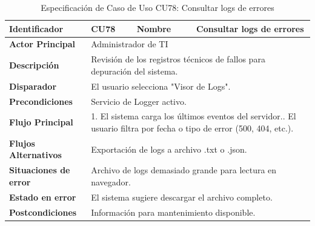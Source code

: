 \begingroup
\setlength{\parskip}{0pt}
\begin{longtable}{|p{3.5cm}|p{2cm}|p{2.5cm}|p{7cm}|}
\caption{Especificación de Caso de Uso CU78: Consultar logs de errores}
\label{tab:cu78} \\
\hline
\textbf{Identificador} & CU78 & \textbf{Nombre} & Consultar logs de errores \\ \hline
\textbf{Actor Principal} & \multicolumn{3}{p{11.5cm}|}{Administrador de TI} \\ \hline
\textbf{Descripción} & \multicolumn{3}{p{11.5cm}|}{Revisión de los registros técnicos de fallos para depuración del sistema.} \\ \hline
\textbf{Disparador} & \multicolumn{3}{p{11.5cm}|}{El usuario selecciona "Visor de Logs".} \\ \hline
\textbf{Precondiciones} & \multicolumn{3}{p{11.5cm}|}{Servicio de Logger activo.} \\ \hline
\textbf{Flujo Principal} & \multicolumn{3}{p{11.5cm}|}{1. El sistema carga los últimos eventos del servidor.\newline 2. El usuario filtra por fecha o tipo de error (500, 404, etc.).} \\ \hline
\textbf{Flujos Alternativos} & \multicolumn{3}{p{11.5cm}|}{Exportación de logs a archivo .txt o .json.} \\ \hline
\textbf{Situaciones de error} & \multicolumn{3}{p{11.5cm}|}{Archivo de logs demasiado grande para lectura en navegador.} \\ \hline
\textbf{Estado en error} & \multicolumn{3}{p{11.5cm}|}{El sistema sugiere descargar el archivo completo.} \\ \hline
\textbf{Postcondiciones} & \multicolumn{3}{p{11.5cm}|}{Información para mantenimiento disponible.} \\ \hline
\end{longtable}
\endgroup

\vspace{0.8cm}

